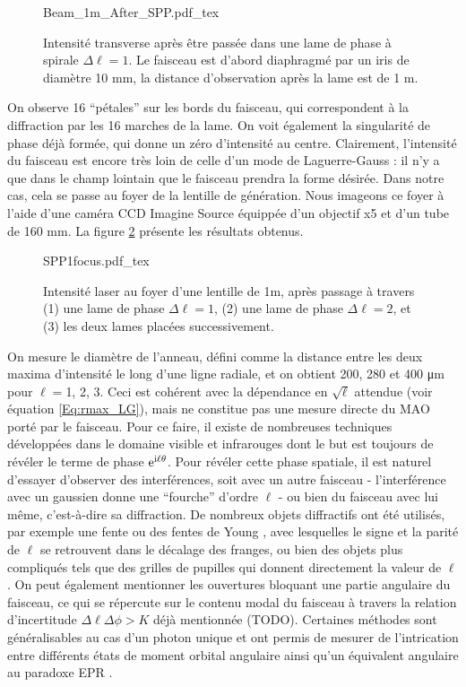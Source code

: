 \begin{figure}[!ht]
\centering
\def\svgwidth{0.4\columnwidth}
{Beam_1m_After_SPP.pdf_tex}
\caption{Intensité transverse après être passée dans une lame de phase à spirale $\Delta\ell = 1$. Le faisceau est d'abord diaphragmé par un iris de diamètre 10 mm, la distance d'observation après la lame est de 1 m.}
\label{Fig:BeamAfterSPP}
\end{figure}

On observe 16 ``pétales'' sur les bords du faisceau, qui correspondent à la diffraction par les 16 marches de la lame. On voit également la singularité de phase déjà formée, qui donne un zéro d'intensité au centre. Clairement, l'intensité du faisceau est encore très loin de celle d'un mode de Laguerre-Gauss : il n'y a que dans le champ lointain que le faisceau prendra la forme désirée. Dans notre cas, cela se passe au foyer de la lentille de génération. Nous imageons ce foyer à l'aide d'une caméra CCD Imagine Source équippée d'un objectif x5 et d'un tube de 160 mm. La figure \ref{Fig:LGFocus} présente les résultats obtenus.\par
\begin{figure}[!ht]
\centering
\def\svgwidth{0.8\columnwidth}
{SPP1focus.pdf_tex}
\caption{Intensité laser au foyer d'une lentille de 1m, après passage à travers (1) une lame de phase $\Delta\ell = 1$, (2) une lame de phase $\Delta\ell = 2$, et (3) les deux lames placées successivement.}
\label{Fig:LGFocus}
\end{figure}
On mesure le diamètre de l'anneau, défini comme la distance entre les deux maxima d'intensité le long d'une ligne radiale, et on obtient 200, 280 et 400 \si{\um} pour $\ell=$1, 2, 3. Ceci est cohérent avec la dépendance en $\sqrt{\ell}$ attendue (voir équation \ref{Eq:rmax_LG}), mais ne constitue pas une mesure directe du MAO porté par le faisceau. Pour ce faire, il existe de nombreuses techniques développées dans le domaine visible et infrarouges dont le but est toujours de révéler le terme de phase $\mathrm{e}^{\mathrm{i}\ell\theta}$. Pour révéler cette phase spatiale, il est naturel d'essayer d'observer des interférences, soit avec un autre faisceau - l'interférence avec un gaussien donne une ``fourche'' d'ordre $\ell$  - ou bien du faisceau avec lui même, c'est-à-dire sa diffraction. De nombreux objets diffractifs ont été utilisés, par exemple une fente  ou des fentes de Young , avec lesquelles le signe et la parité de $\ell$ se retrouvent dans le décalage des franges, ou bien des objets plus compliqués tels que des grilles de pupilles  qui donnent directement la valeur de $\ell$. On peut également mentionner les ouvertures bloquant une partie angulaire du faisceau, ce qui se répercute sur le contenu modal du faisceau à travers la relation d'incertitude $\Delta\ell\Delta\phi > K$ déjà mentionnée (TODO). Certaines méthodes sont généralisables au cas d'un photon unique et ont permis de mesurer de l'intrication entre différents états de moment orbital angulaire  ainsi qu'un équivalent angulaire au paradoxe EPR . \par 
